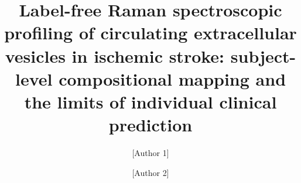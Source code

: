 \documentclass[preprint,12pt]{elsarticle}
\begin{document}
\begin{frontmatter}



\title{Label-free Raman spectroscopic profiling of circulating extracellular
 vesicles in ischemic stroke: subject-level compositional mapping and the
 limits of individual clinical prediction}


\author[1]{[Author 1]} %

\author[1,2]{[Author 2]}

   


\end{frontmatter}
\end{document}
